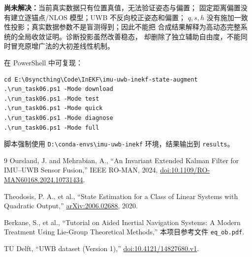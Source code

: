 \documentclass[11pt,a4paper]{ctexart}
\begin{document}
\textbf{尚未解决：}当前真实数据只有位置真值，无法验证姿态与偏置；
固定距离偏置没有建立逐锚点/NLOS 模型；UWB 不反向校正姿态和偏置；
$q,s,h$ 没有施加一致性投影；真实数据参数不是盲测得到；因此不能把
合成结果解释为高动态完整系统的全局收敛证明。诊断投影虽然改善稳态，
却删除了独立辅助自由度，不能同时冒充原增广法的大初差线性机制。

在 PowerShell 中可复现：
\begin{verbatim}
cd E:\0syncthing\Code\InEKF\imu-uwb-inekf-state-augment
.\run_task06.ps1 -Mode download
.\run_task06.ps1 -Mode test
.\run_task06.ps1 -Mode quick
.\run_task06.ps1 -Mode diagnose
.\run_task06.ps1 -Mode full
\end{verbatim}
脚本强制使用
\texttt{D:\textbackslash conda-envs\textbackslash imu-uwb-inekf}
环境，结果输出到 \texttt{results}。

\begin{thebibliography}{9}
Oursland, J. and Mehrabian, A.,
``An Invariant Extended Kalman Filter for IMU--UWB Sensor Fusion,''
IEEE RO-MAN, 2024,
\href{https://doi.org/10.1109/RO-MAN60168.2024.10731434}
{doi:10.1109/RO-MAN60168.2024.10731434}.

Theodosis, P. A., et al.,
``State Estimation for a Class of Linear Systems with Quadratic Output,''
\href{https://arxiv.org/abs/2006.02688}{arXiv:2006.02688}, 2020.

Berkane, S., et al.,
``Tutorial on Aided Inertial Navigation Systems:
A Modern Treatment Using Lie-Group Theoretical Methods,''
本项目参考文件 \texttt{eq\_ob.pdf}.

TU Delft,
``UWB dataset (Version 1),''
\href{https://doi.org/10.4121/14827680.v1}{doi:10.4121/14827680.v1}.
\end{thebibliography}
\end{document}
